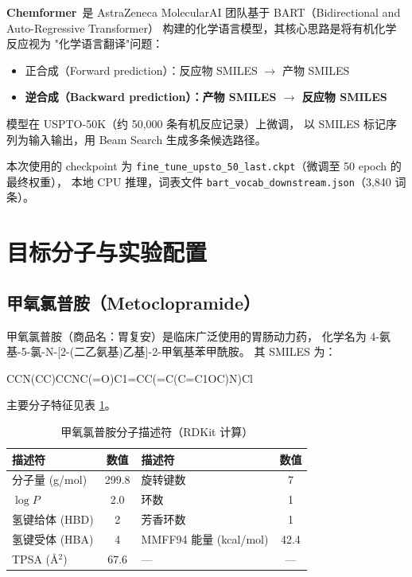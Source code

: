 \documentclass[a4paper, 12pt]{article}
\begin{document}
\textbf{Chemformer}\,\cite{irwin2022} 是 AstraZeneca MolecularAI
团队基于 BART（Bidirectional and Auto-Regressive Transformer）
构建的化学语言模型，其核心思路是将有机化学反应视为
"化学语言翻译"问题：
\begin{itemize}[leftmargin=2em]
  \item 正合成（Forward prediction）：反应物 SMILES $\to$ 产物 SMILES
  \item \textbf{逆合成（Backward prediction）：产物 SMILES $\to$ 反应物 SMILES}
\end{itemize}
模型在 USPTO-50K（约 50,000 条有机反应记录）上微调，
以 SMILES 标记序列为输入输出，用 Beam Search 生成多条候选路径。

本次使用的 checkpoint 为
\texttt{fine\_tune\_upsto\_50\_last.ckpt}（微调至 50 epoch 的最终权重），
本地 CPU 推理，词表文件
\texttt{bart\_vocab\_downstream.json}（3,840 词条）。

\section{目标分子与实验配置}

\subsection{甲氧氯普胺（Metoclopramide）}

甲氧氯普胺（商品名：胃复安）是临床广泛使用的胃肠动力药，
化学名为 4-氨基-5-氯-N-[2-(二乙氨基)乙基]-2-甲氧基苯甲酰胺。
其 SMILES 为：

\begin{center}
\ttfamily\small CCN(CC)CCNC(=O)C1=CC(=C(C=C1OC)N)Cl
\end{center}

主要分子特征见表 \ref{tab:target_props}。

\begin{table}[H]
  \centering
  \caption{甲氧氯普胺分子描述符（RDKit 计算）}
  \label{tab:target_props}
  \begin{tabular}{lclc}
    \toprule
    \textbf{描述符} & \textbf{数值} &
    \textbf{描述符} & \textbf{数值} \\
    \midrule
    分子量 (g/mol)      & 299.8 & 旋转键数      & 7 \\
    $\log P$            & 2.0   & 环数          & 1 \\
    氢键给体 (HBD)      & 2     & 芳香环数      & 1 \\
    氢键受体 (HBA)      & 4     & MMFF94 能量 (kcal/mol) & 42.4 \\
    TPSA (\AA$^2$)      & 67.6  & — & — \\
    \bottomrule
  \end{tabular}
\end{table}
\end{document}
